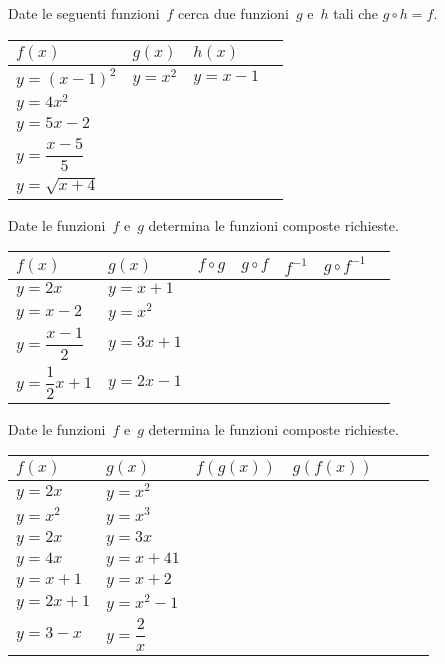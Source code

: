 \begin{esercizio}
 \label{ese:\thechapter.14}
Date le seguenti funzioni~$f$ cerca due funzioni~$g$ e~$h$ tali che $ g \circ h=f $.
\begin{center}
\begin{tabular}{l*3{l}}
\toprule
$f(x)$ & $ g(x)$ & $ h(x)$ & \\
\midrule
$y=(x-1)^2$ & $y=x^2$ & $y=x-1$\\
$y=4x^2$ &  & \\
$y=5x-2$ &  & \\
$y=\dfrac{x-5}{5}$ &  & \\
$y=\sqrt{x+4}$ &  & \\
\bottomrule
\end{tabular}
\end{center}
\end{esercizio}

\begin{esercizio}
 \label{ese:\thechapter.15}
Date le funzioni~$f$ e~$g$ determina le funzioni composte richieste.
\begin{center}
\begin{tabular}{l*6{l}}
\toprule
$f(x)$ & $ g(x)$ & $f \circ g$ & $g \circ f$ & $f^{-1}$ & $g \circ f^{-1}$\\
\midrule
$y=2x$ & $y=x+1$  & & & & \\
$y=x-2$ & $y=x^{2}$ & & & & \\
$y=\dfrac{x-1}{2}$ & $y=3x+1$ & & & & \\
$y=\dfrac{1}{2}x+1$ & $y=2x-1$ & & & & \\
\bottomrule
\end{tabular}
\end{center}
\end{esercizio}

\begin{esercizio}
 \label{ese:\thechapter.16}
Date le funzioni~$f$ e~$g$ determina le funzioni composte richieste.
\begin{center}
\begin{tabular}{l*6{l}}
\toprule
$f(x)$ & $ g(x)$ & $f(g(x))$ & $g(f(x))$\\
\midrule
$y=2x$ & $y=x^2$  & & \\
$y=x^2$ & $y=x^{3}$ & & \\
$y=2x$ & $y=3x$ & & \\
$y=4x$ & $y=x+41$ & & \\
$y=x+1$ & $y=x+2$  & & \\
$y=2x+1$ & $y=x^2-1$  & & \\
$y=3-x$ & $y=\dfrac{2}{x}$  & & \\
\bottomrule
\end{tabular}
\end{center}
\end{esercizio}

